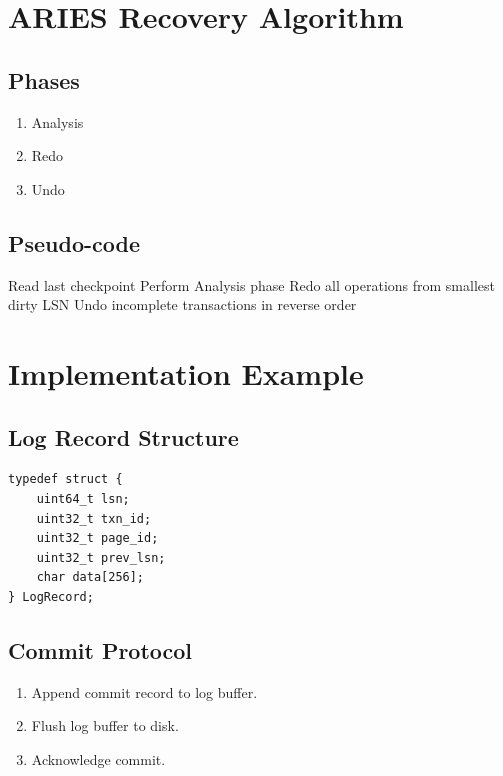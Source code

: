 \documentclass[12pt,a4paper]{report}
\begin{document}
\chapter{ARIES Recovery Algorithm}

\section{Phases}

\begin{enumerate}
    \item Analysis
    \item Redo
    \item Undo
\end{enumerate}

\section{Pseudo-code}

\begin{algorithm}[H]
\SetAlgoLined
{}
Read last checkpoint\;
Perform Analysis phase\;
Redo all operations from smallest dirty LSN\;
Undo incomplete transactions in reverse order\;
\caption{ARIES Recovery}
\end{algorithm}

\chapter{Implementation Example}

\section{Log Record Structure}

\begin{lstlisting}
typedef struct {
    uint64_t lsn;
    uint32_t txn_id;
    uint32_t page_id;
    uint32_t prev_lsn;
    char data[256];
} LogRecord;
\end{lstlisting}

\section{Commit Protocol}

\begin{enumerate}
    \item Append commit record to log buffer.
    \item Flush log buffer to disk.
    \item Acknowledge commit.
\end{enumerate}
\end{document}
